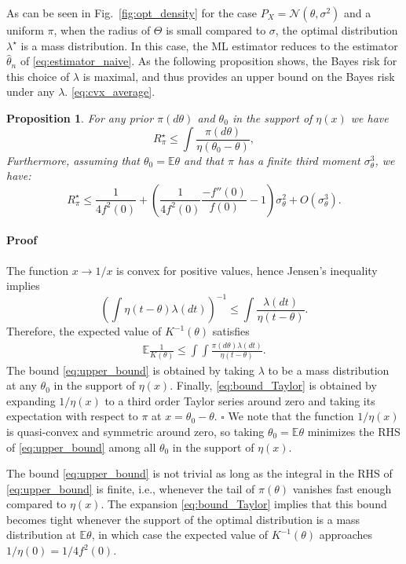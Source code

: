 \documentclass[letterpaper, conference, 11pt]{IEEEtran}      %
\newtheorem{prop}[thm]{\bf {Proposition}}
\newenvironment{proof}{\paragraph*{Proof}}{\hfill$\square$ \newline}
\begin{document}
As can be seen in Fig.~\ref{fig:opt_density} for the case $P_X = \mathcal N(\theta ,\sigma^2)$ and a uniform $\pi$, when the radius of $\Theta$ is small compared to $\sigma$, the optimal distribution $\lambda^\star$ is a mass distribution. In this case, the ML estimator reduces to the estimator $\hat{\theta}_n$ of \eqref{eq:estimator_naive}. As the following proposition shows, the Bayes risk for this choice of $\lambda$ is maximal, and thus provides an upper bound on the Bayes risk under any $\lambda$. 
 \eqref{eq:cvx_average}. 
\begin{prop}\label{prop:upper_bound}
For any prior $\pi(d\theta)$ and $\theta_0$ in the support of $\eta(x)$ we have
\begin{equation} 
\label{eq:upper_bound}
R_\pi^\star  \leq 
 \int \frac{\pi(d\theta)}{\eta \left( \theta_0 - \theta \right)},
\end{equation}
Furthermore, assuming that $\theta_0 = \mathbb E \theta$ and that $\pi$ has a finite third moment $\sigma_\theta^3$, we have: 
\begin{equation}
\label{eq:bound_Taylor}
R^\star_\pi \leq \frac{1}{4 f^2(0)} + \left(\frac{1}{4 f^2(0)} \frac{-f''(0)}{f(0)} -1 \right) \sigma_\theta^2 + O(\sigma_\theta^3).
\end{equation}
\end{prop}
\begin{proof}
The function $x \rightarrow 1/x$ is convex for positive values, hence Jensen's inequality implies
\[
\left( \int \eta \left( t-\theta\right) \lambda(dt) \right)^{-1}  \leq \int  \frac{ \lambda(dt)}{ \eta \left( t-\theta\right)  }. 
\]
Therefore, the expected value of $K^{-1}(\theta)$ satisfies
\begin{align}
\mathbb E  \frac{1}{K(\theta)}  \leq \int \int \frac{\pi(d\theta) \lambda(dt) }{\eta \left( t - \theta \right)}. \label{eq:upper_bound_proof}
\end{align}
The bound \eqref{eq:upper_bound} is obtained by taking $\lambda$ to be a mass distribution at any $\theta_0$ in the support of $\eta(x)$. Finally, \eqref{eq:bound_Taylor} is obtained by expanding $1/\eta(x)$ to a third order Taylor series around zero
and taking its expectation with respect to $\pi$ at $x=\theta_0-\theta$. 
\end{proof}
We note that the function $1/\eta(x)$ is quasi-convex and symmetric around zero, so taking $\theta_0 = \mathbb E \theta$ minimizes the RHS of \eqref{eq:upper_bound} among all $\theta_0$ in the support of $\eta(x)$.\par
The bound \eqref{eq:upper_bound} is not trivial as long as the integral in the RHS of \eqref{eq:upper_bound} is finite, i.e., whenever the tail of $\pi(\theta)$ vanishes fast enough compared to $\eta(x)$. The expansion \eqref{eq:bound_Taylor} implies that this bound becomes tight whenever the support of the optimal distribution is a mass distribution at $\mathbb E \theta$, in which case the expected value of $K^{-1}(\theta)$ approaches $1/\eta(0) = 1/4f^2(0)$. 
\end{document}
